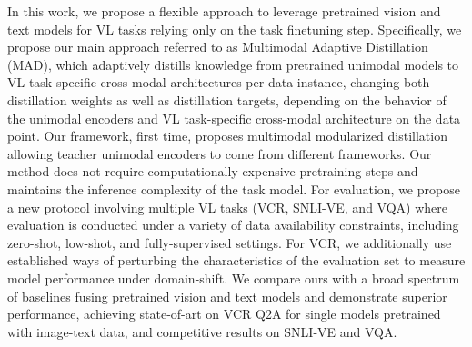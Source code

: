 \documentclass[runningheads]{llncs}
\begin{document}
In this work, we propose a flexible approach to leverage pretrained vision and text models for VL tasks relying only on the task finetuning step. Specifically, we propose our main approach referred to as Multimodal Adaptive Distillation (MAD), which adaptively distills knowledge from pretrained unimodal models to VL task-specific cross-modal architectures per data instance, changing both distillation weights as well as distillation targets, depending on the behavior of the unimodal encoders and VL task-specific cross-modal architecture on the data point. Our framework, first time, proposes multimodal modularized distillation allowing teacher unimodal encoders to come from different frameworks. Our method does not require computationally expensive pretraining steps and maintains the inference complexity of the task model. For evaluation, we propose a new protocol involving multiple VL tasks (VCR, SNLI-VE, and VQA) where evaluation is conducted under a variety of data availability constraints, including zero-shot, low-shot, and fully-supervised settings. For VCR, we additionally use established ways of perturbing the characteristics of the evaluation set to measure model performance under domain-shift. We compare ours with a broad spectrum of baselines fusing pretrained vision and text models and demonstrate superior performance, achieving state-of-art on VCR Q2A for single models pretrained with image-text data, and competitive results on SNLI-VE and VQA.
\end{document}
